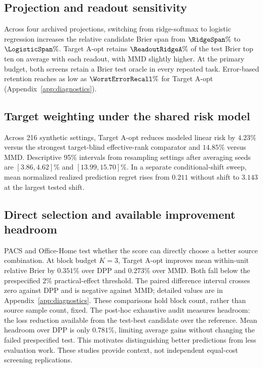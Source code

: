 \subsection{Projection and readout sensitivity}
\label{sec:readout}
Across four archived projections, switching from ridge-softmax to logistic regression increases the relative candidate Brier span from $\RidgeSpan\%$ to $\LogisticSpan\%$. Target A-opt retains $\ReadoutRidgeA\%$ of the test Brier top ten on average with each readout, with MMD slightly higher. At the primary budget, both screens retain a Brier test oracle in every repeated task. Error-based retention reaches as low as $\WorstErrorRecall\%$ for Target A-opt (Appendix~\ref{app:diagnostics}).

\subsection{Target weighting under the shared risk model}
Across 216 synthetic settings, Target A-opt reduces modeled linear risk by $4.23\%$ versus the strongest target-blind effective-rank comparator and $14.85\%$ versus MMD. Descriptive 95\% intervals from resampling settings after averaging seeds are $[3.86,4.62]\%$ and $[13.99,15.70]\%$. In a separate conditional-shift sweep, mean normalized realized prediction regret rises from $0.211$ without shift to $3.143$ at the largest tested shift.

\subsection{Direct selection and available improvement headroom}
PACS and Office-Home test whether the score can directly choose a better source combination. At block budget $K=3$, Target A-opt improves mean within-unit relative Brier by $0.351\%$ over DPP and $0.273\%$ over MMD. Both fall below the prespecified $2\%$ practical-effect threshold. The paired difference interval crosses zero against DPP and is negative against MMD; detailed values are in Appendix~\ref{app:diagnostics}. These comparisons hold block count, rather than source sample count, fixed.
The post-hoc exhaustive audit measures headroom: the loss reduction available from the test-best candidate over the reference. Mean headroom over DPP is only $0.781\%$, limiting average gains without changing the failed prespecified test. This motivates distinguishing better predictions from less evaluation work. These studies provide context, not independent equal-cost screening replications.

